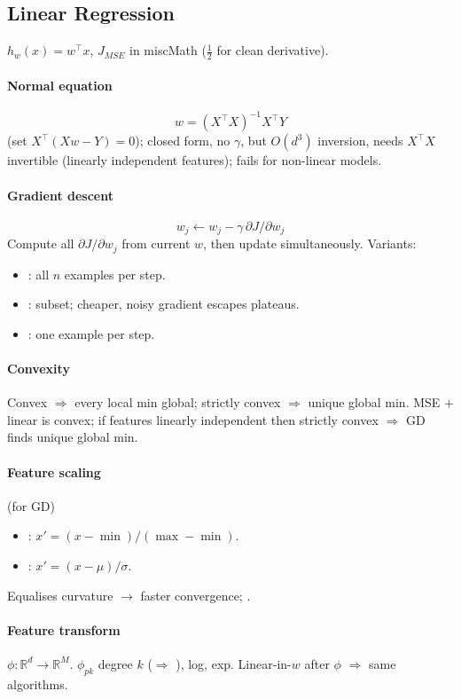 \subsection{Linear Regression}
 $h_w(x){=}w^{\top}x$, $J_{MSE}$ in miscMath ($\tfrac12$ for clean derivative).
\paragraph{Normal equation}
\[w=(X^{\top}X)^{-1}X^{\top}Y\]
(set $X^{\top}(Xw{-}Y){=}0$); closed form, no $\gamma$, but $O(d^3)$ inversion, needs $X^{\top}X$ invertible (linearly independent features); fails for non-linear models.
\paragraph{Gradient descent}
\[w_j\leftarrow w_j-\gamma\,\partial J/\partial w_j\]
 Compute all $\partial J/\partial w_j$ from current $w$, then update simultaneously. Variants:
\begin{itemize}
\item {}: all $n$ examples per step.
\item {}: subset; cheaper, noisy gradient escapes plateaus.
\item {}: one example per step.
\end{itemize}
\paragraph{Convexity} Convex $\Rightarrow$ every local min global; strictly convex $\Rightarrow$ unique global min. MSE $+$ linear is convex; if features linearly independent then strictly convex $\Rightarrow$ GD finds unique global min.
\paragraph{Feature scaling} (for GD)
\begin{itemize}
\item {}: $x'{=}(x{-}\min)/(\max{-}\min)$.
\item {}: $x'{=}(x{-}\mu)/\sigma$.
\end{itemize}
Equalises curvature $\to$ faster convergence; .
\paragraph{Feature transform} $\phi:\mathbb{R}^d\!\to\!\mathbb{R}^M$.  $\phi_{pk}$ degree $k$ ($\Rightarrow$ ), log, exp. Linear-in-$w$ after $\phi$ $\Rightarrow$ same algorithms.

